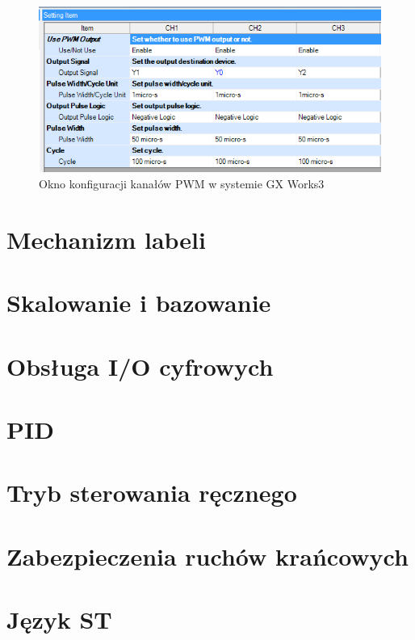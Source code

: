 \documentclass{mwrep}
\begin{document}
\begin{figure}[H]
    \label{PLC::Konfiguracja::HIOEN::WindowCH5}
    \centering
    \includegraphics[scale=0.5]{pwm.png}
    \caption{Okno konfiguracji kanałów PWM w systemie GX Works3}
\end{figure}

\section{Mechanizm labeli}
\label{PLC::Labels}

\section{Skalowanie i bazowanie}
\label{PLC::Bazowanie}

\section{Obsługa I/O cyfrowych}
\label{PLC::IOCyfrowe}

\section{PID}
\label{PLC::PID}

\section{Tryb sterowania ręcznego}
\label{PLC::Reka}

\section{Zabezpieczenia ruchów krańcowych}
\label{PLC::Krancowki}

\section{Język ST}
\label{PLC::ST}
\end{document}
